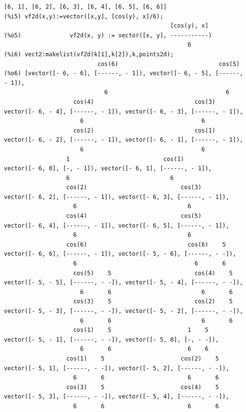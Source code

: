 \documentclass[12pt,letterpaper]{article}
\begin{document}
\begin{verbatim}
[6, 1], [6, 2], [6, 3], [6, 4], [6, 5], [6, 6]]
(%i5) vf2d(x,y):=vector([x,y], [cos(y), x]/6);
                                                [cos(y), x]
(%o5)              vf2d(x, y) := vector([x, y], -----------)
                                                     6
(%i6) vect2:makelist(vf2d(k[1],k[2]),k,points2d);
                           cos(6)                             cos(5)
(%o6) [vector([- 6, - 6], [------, - 1]), vector([- 6, - 5], [------, - 1]), 
                             6                                  6
                    cos(4)                             cos(3)
vector([- 6, - 4], [------, - 1]), vector([- 6, - 3], [------, - 1]), 
                      6                                  6
                    cos(2)                             cos(1)
vector([- 6, - 2], [------, - 1]), vector([- 6, - 1], [------, - 1]), 
                      6                                  6
                  1                           cos(1)
vector([- 6, 0], [-, - 1]), vector([- 6, 1], [------, - 1]), 
                  6                             6
                  cos(2)                           cos(3)
vector([- 6, 2], [------, - 1]), vector([- 6, 3], [------, - 1]), 
                    6                                6
                  cos(4)                           cos(5)
vector([- 6, 4], [------, - 1]), vector([- 6, 5], [------, - 1]), 
                    6                                6
                  cos(6)                             cos(6)    5
vector([- 6, 6], [------, - 1]), vector([- 5, - 6], [------, - -]), 
                    6                                  6       6
                    cos(5)    5                        cos(4)    5
vector([- 5, - 5], [------, - -]), vector([- 5, - 4], [------, - -]), 
                      6       6                          6       6
                    cos(3)    5                        cos(2)    5
vector([- 5, - 3], [------, - -]), vector([- 5, - 2], [------, - -]), 
                      6       6                          6       6
                    cos(1)    5                      1    5
vector([- 5, - 1], [------, - -]), vector([- 5, 0], [-, - -]), 
                      6       6                      6    6
                  cos(1)    5                      cos(2)    5
vector([- 5, 1], [------, - -]), vector([- 5, 2], [------, - -]), 
                    6       6                        6       6
                  cos(3)    5                      cos(4)    5
vector([- 5, 3], [------, - -]), vector([- 5, 4], [------, - -]), 
                    6       6                        6       6

\end{verbatim}
\end{document}
